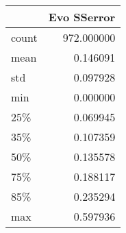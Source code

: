 \begin{tabular}{lr}
\toprule
{} &  Evo SSerror \\
\midrule
count &   972.000000 \\
mean  &     0.146091 \\
std   &     0.097928 \\
min   &     0.000000 \\
25\%   &     0.069945 \\
35\%   &     0.107359 \\
50\%   &     0.135578 \\
75\%   &     0.188117 \\
85\%   &     0.235294 \\
max   &     0.597936 \\
\bottomrule
\end{tabular}

